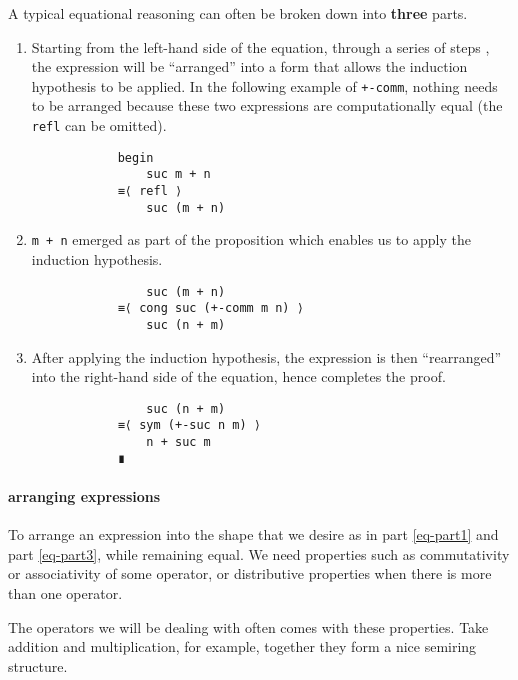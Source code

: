 \documentclass[../thesis.tex]{subfiles}
\begin{document}
A typical equational reasoning can often be broken down into \textbf{three} parts.

\begin{enumerate}
    \item\label{eq-part1}
        Starting from the left-hand side of the equation, through a series of steps
        , the expression will be ``arranged'' into a form that allows the induction
        hypothesis to be applied.
        In the following example of {\lstinline|+-comm|}, nothing needs to be arranged
        because these two expressions are computationally equal
        (the {\lstinline|refl|} can be omitted).

        \begin{lstlisting}
            begin
                suc m + n
            ≡⟨ refl ⟩
                suc (m + n)
        \end{lstlisting}
    \item\label{eq-part2}
        {\lstinline|m + n|} emerged as part of the proposition which enables us
        to apply the induction hypothesis.

        \begin{lstlisting}
                suc (m + n)
            ≡⟨ cong suc (+-comm m n) ⟩
                suc (n + m)
        \end{lstlisting}
    \item\label{eq-part3}
        After applying the induction hypothesis, the expression is then ``rearranged''
        into the right-hand side of the equation, hence completes the proof.

        \begin{lstlisting}
                suc (n + m)
            ≡⟨ sym (+-suc n m) ⟩
                n + suc m
            ∎
        \end{lstlisting}
\end{enumerate}

\paragraph{arranging expressions}

To arrange an expression into the shape that we desire as in part \ref{eq-part1} and
part \ref{eq-part3}, while remaining equal.
We need properties such as commutativity or associativity of some operator,
or distributive properties when there is more than one operator.

The operators we will be dealing with often comes with these properties.
Take addition and multiplication, for example, together they form a nice semiring
structure.
\end{document}
